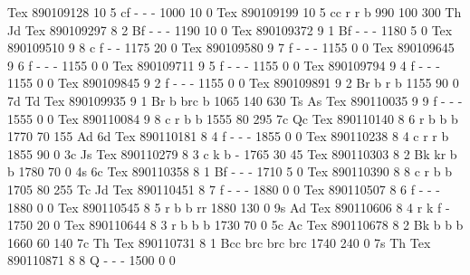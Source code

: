 Tex       890109128 10  5 cf  -     -     -         1000   10    0 
Tex       890109199 10  5 cc  r     r     b          990  100  300 Th Jd
Tex       890109297  8  2 Bf  -     -     -         1190   10    0 
Tex       890109372  9  1 Bf  -     -     -         1180    5    0 
Tex       890109510  9  8 c   f     -     -         1175   20    0 
Tex       890109580  9  7 f   -     -     -         1155    0    0 
Tex       890109645  9  6 f   -     -     -         1155    0    0 
Tex       890109711  9  5 f   -     -     -         1155    0    0 
Tex       890109794  9  4 f   -     -     -         1155    0    0 
Tex       890109845  9  2 f   -     -     -         1155    0    0 
Tex       890109891  9  2 Br  b     r     b         1155   90    0 7d Td
Tex       890109935  9  1 Br  b     brc   b         1065  140  630 Ts As
Tex       890110035  9  9 f   -     -     -         1555    0    0 
Tex       890110084  9  8 c   r     b     b         1555   80  295 7c Qc
Tex       890110140  8  6 r   b     b     b         1770   70  155 Ad 6d
Tex       890110181  8  4 f   -     -     -         1855    0    0 
Tex       890110238  8  4 c   r     r     b         1855   90    0 3c Js
Tex       890110279  8  3 c   k     b     -         1765   30   45 
Tex       890110303  8  2 Bk  kr    b     b         1780   70    0 4s 6c
Tex       890110358  8  1 Bf  -     -     -         1710    5    0 
Tex       890110390  8  8 c   r     b     b         1705   80  255 Tc Jd
Tex       890110451  8  7 f   -     -     -         1880    0    0 
Tex       890110507  8  6 f   -     -     -         1880    0    0 
Tex       890110545  8  5 r   b     b     rr        1880  130    0 9s Ad
Tex       890110606  8  4 r   k     f     -         1750   20    0 
Tex       890110644  8  3 r   b     b     b         1730   70    0 5c Ac
Tex       890110678  8  2 Bk  b     b     b         1660   60  140 7c Th
Tex       890110731  8  1 Bcc brc   brc   brc       1740  240    0 7s Th
Tex       890110871  8  8 Q   -     -     -         1500    0    0 
